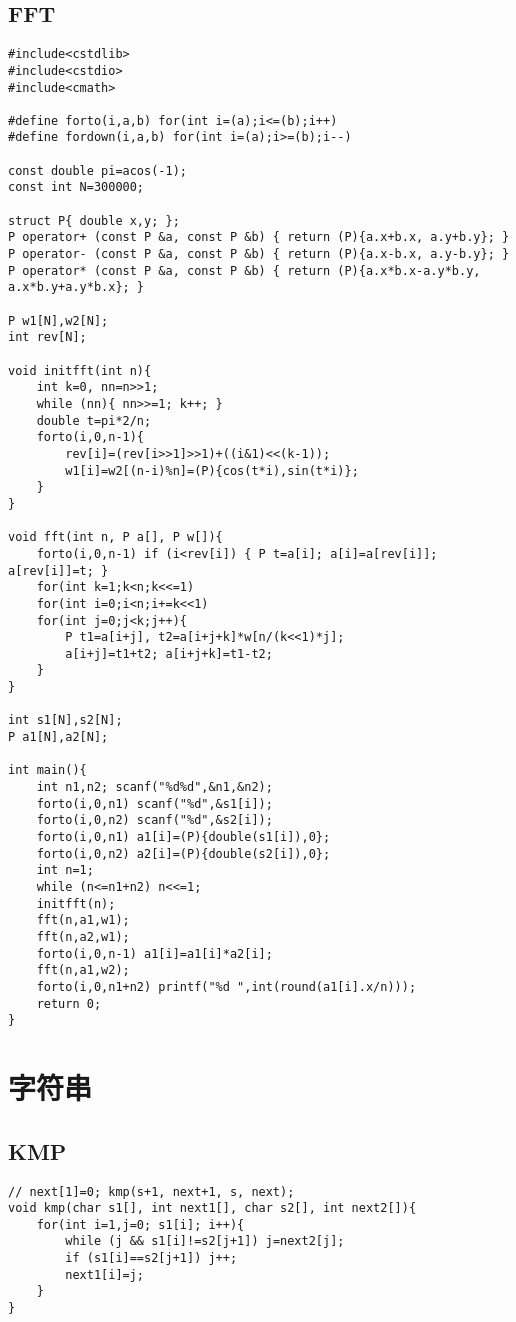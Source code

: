 \documentclass{article}
\begin{document}
\subsection{FFT}
\begin{lstlisting}
#include<cstdlib>
#include<cstdio>
#include<cmath>

#define forto(i,a,b) for(int i=(a);i<=(b);i++)
#define fordown(i,a,b) for(int i=(a);i>=(b);i--)

const double pi=acos(-1);
const int N=300000;

struct P{ double x,y; };
P operator+ (const P &a, const P &b) { return (P){a.x+b.x, a.y+b.y}; }
P operator- (const P &a, const P &b) { return (P){a.x-b.x, a.y-b.y}; }
P operator* (const P &a, const P &b) { return (P){a.x*b.x-a.y*b.y, a.x*b.y+a.y*b.x}; }

P w1[N],w2[N];
int rev[N];

void initfft(int n){
	int k=0, nn=n>>1;
	while (nn){ nn>>=1; k++; }
	double t=pi*2/n;
	forto(i,0,n-1){
		rev[i]=(rev[i>>1]>>1)+((i&1)<<(k-1));
		w1[i]=w2[(n-i)%n]=(P){cos(t*i),sin(t*i)};
	}
}

void fft(int n, P a[], P w[]){
	forto(i,0,n-1) if (i<rev[i]) { P t=a[i]; a[i]=a[rev[i]]; a[rev[i]]=t; }
	for(int k=1;k<n;k<<=1)
	for(int i=0;i<n;i+=k<<1)
	for(int j=0;j<k;j++){
		P t1=a[i+j], t2=a[i+j+k]*w[n/(k<<1)*j];
		a[i+j]=t1+t2; a[i+j+k]=t1-t2;
	}
}

int s1[N],s2[N];
P a1[N],a2[N];

int main(){
	int n1,n2; scanf("%d%d",&n1,&n2);
	forto(i,0,n1) scanf("%d",&s1[i]);
	forto(i,0,n2) scanf("%d",&s2[i]);
	forto(i,0,n1) a1[i]=(P){double(s1[i]),0};
	forto(i,0,n2) a2[i]=(P){double(s2[i]),0};
	int n=1;
	while (n<=n1+n2) n<<=1;
	initfft(n);
	fft(n,a1,w1);
	fft(n,a2,w1);
	forto(i,0,n-1) a1[i]=a1[i]*a2[i];
	fft(n,a1,w2);
	forto(i,0,n1+n2) printf("%d ",int(round(a1[i].x/n)));
	return 0;
}
\end{lstlisting}


\section{字符串}

\subsection{KMP}
\begin{lstlisting}
// next[1]=0; kmp(s+1, next+1, s, next);
void kmp(char s1[], int next1[], char s2[], int next2[]){
	for(int i=1,j=0; s1[i]; i++){
        while (j && s1[i]!=s2[j+1]) j=next2[j];
        if (s1[i]==s2[j+1]) j++;
        next1[i]=j;
    }
}
\end{lstlisting}
\end{document}
